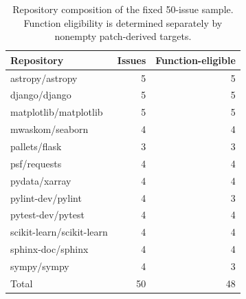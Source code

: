 \begin{table}[t]
\caption{Repository composition of the fixed 50-issue sample. Function eligibility is determined separately by nonempty patch-derived targets.}\label{tab:eval-coverage}
\centering\small
\begin{tabular*}{\textwidth}{@{\extracolsep{\fill}}lrr@{}}\toprule
Repository & Issues & Function-eligible\\\midrule
astropy/astropy & 5 & 5\\
django/django & 5 & 5\\
matplotlib/matplotlib & 5 & 5\\
mwaskom/seaborn & 4 & 4\\
pallets/flask & 3 & 3\\
psf/requests & 4 & 4\\
pydata/xarray & 4 & 4\\
pylint-dev/pylint & 4 & 3\\
pytest-dev/pytest & 4 & 4\\
scikit-learn/scikit-learn & 4 & 4\\
sphinx-doc/sphinx & 4 & 4\\
sympy/sympy & 4 & 3\\
\midrule Total & 50 & 48\\
\bottomrule\end{tabular*}
\end{table}
